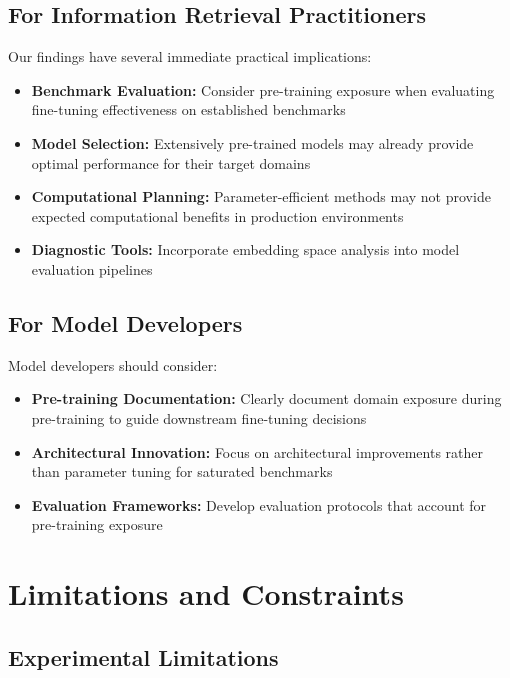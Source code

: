 \subsection{For Information Retrieval Practitioners}

Our findings have several immediate practical implications:

\begin{itemize}
\item \textbf{Benchmark Evaluation:} Consider pre-training exposure when evaluating fine-tuning effectiveness on established benchmarks
\item \textbf{Model Selection:} Extensively pre-trained models may already provide optimal performance for their target domains
\item \textbf{Computational Planning:} Parameter-efficient methods may not provide expected computational benefits in production environments
\item \textbf{Diagnostic Tools:} Incorporate embedding space analysis into model evaluation pipelines
\end{itemize}

\subsection{For Model Developers}

Model developers should consider:

\begin{itemize}
\item \textbf{Pre-training Documentation:} Clearly document domain exposure during pre-training to guide downstream fine-tuning decisions
\item \textbf{Architectural Innovation:} Focus on architectural improvements rather than parameter tuning for saturated benchmarks
\item \textbf{Evaluation Frameworks:} Develop evaluation protocols that account for pre-training exposure
\end{itemize}

\section{Limitations and Constraints}

\subsection{Experimental Limitations}

